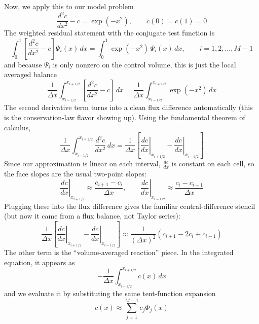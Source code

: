 Now, we apply this to our model problem
\begin{equation}
    \frac{d^2 c}{dx^2} - c = \exp(-x^2), \qquad c(0)=c(1)=0
\end{equation}
The weighted residual statement with the conjugate test function is
\begin{equation}
    \int_0^1 \left[\frac{d^2 c}{dx^2} - c\right]\Psi_i(x)\,dx
    =
    \int_0^1 \exp(-x^2)\,\Psi_i(x)\,dx,
    \qquad i=1,2,\dots,M-1
\end{equation}
and because $\Psi_i$ is only nonzero on the control volume, this is just the local averaged balance
\begin{equation}
    \frac{1}{\Delta x}\int_{x_{i-1/2}}^{x_{i+1/2}}
    \left[\frac{d^2 c}{dx^2} - c\right]\,dx
    =
    \frac{1}{\Delta x}\int_{x_{i-1/2}}^{x_{i+1/2}} \exp(-x^2)\,dx
\end{equation}
The second derivative term turns into a clean flux difference automatically (this is the conservation-law flavor showing up). Using the fundamental theorem of calculus,
\begin{equation}
    \frac{1}{\Delta x}\int_{x_{i-1/2}}^{x_{i+1/2}} \frac{d^2 c}{dx^2}\,dx
    =
    \frac{1}{\Delta x}\left[\left.\frac{dc}{dx}\right|_{x_{i+1/2}} - \left.\frac{dc}{dx}\right|_{x_{i-1/2}}\right]
\end{equation}
Since our approximation is linear on each interval, $\frac{dc}{dx}$ is constant on each cell, so the face slopes are the usual two-point slopes:
\begin{equation}
    \left.\frac{dc}{dx}\right|_{x_{i+1/2}} \approx \frac{c_{i+1}-c_i}{\Delta x},
    \qquad
    \left.\frac{dc}{dx}\right|_{x_{i-1/2}} \approx \frac{c_i-c_{i-1}}{\Delta x}
\end{equation}
Plugging these into the flux difference gives the familiar central-difference stencil (but now it came from a flux balance, not Taylor series):
\begin{equation}
    \frac{1}{\Delta x}\left[\left.\frac{dc}{dx}\right|_{x_{i+1/2}} - \left.\frac{dc}{dx}\right|_{x_{i-1/2}}\right]
    \approx
    \frac{1}{(\Delta x)^2}\left(c_{i+1}-2c_i+c_{i-1}\right)
\end{equation}
The other term is the ``volume-averaged reaction'' piece. In the integrated equation, it appears as
\begin{equation}
    -\frac{1}{\Delta x}\int_{x_{i-1/2}}^{x_{i+1/2}} c(x)\,dx
\end{equation}
and we evaluate it by substituting the same tent-function expansion
\begin{equation}
    c(x) \approx \sum_{j=1}^{M-1} c_j\Phi_j(x)
\end{equation}
